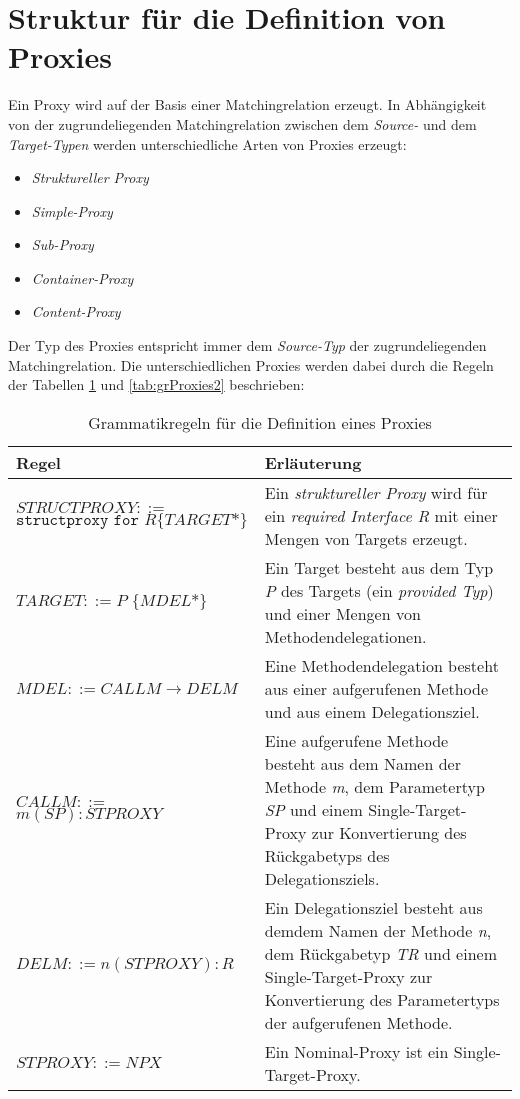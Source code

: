 \documentclass[a4paper,12pt]{article}
\begin{document}
\section{Struktur für die Definition von Proxies}\label{sec:proxygram}
Ein Proxy wird auf der Basis einer Matchingrelation erzeugt. In Abhängigkeit von der zugrundeliegenden Matchingrelation zwischen dem \emph{Source-} und dem \emph{Target-Typen} werden unterschiedliche Arten von Proxies erzeugt:
\begin{itemize}
\item \emph{Struktureller Proxy}
\item \emph{Simple-Proxy}
\item \emph{Sub-Proxy}
\item \emph{Container-Proxy}
\item \emph{Content-Proxy}
\end{itemize}
Der Typ des Proxies entspricht immer dem \emph{Source-Typ} der zugrundeliegenden Matchingrelation. Die unterschiedlichen Proxies werden dabei durch die Regeln der Tabellen \ref{tab:grProxies1} und \ref{tab:grProxies2} beschrieben:
\begin{table}[H]
\centering
\begin{tabular}{|p{6cm}|p{8cm}|}
\hline
\hline
\centering\textbf{Regel} & \textbf{Erläuterung} \\
\hline
\hline
$\mathit{STRUCTPROXY} ::=$\newline $\texttt{structproxy } \texttt{for } R$\newline$ \texttt{\{}TARGET\text{*}\texttt{\}}$ & Ein \emph{struktureller Proxy} wird für ein \emph{required Interface R} mit einer Mengen von Targets erzeugt.  \\
\hline
$\mathit{TARGET} ::=$\newline $P \texttt{ \{}MDEL\text{*}\texttt{\}}$ & Ein Target besteht aus dem Typ \emph{P} des Targets (ein \emph{provided Typ}) und einer Mengen von Methodendelegationen.\\
\hline
$\mathit{MDEL} ::= CALLM \rightarrow DELM $  & Eine Methodendelegation besteht aus einer aufgerufenen Methode und aus einem Delegationsziel.\\
\hline
$\mathit{CALLM} ::=$\newline $m(SP):STPROXY $  & Eine aufgerufene Methode besteht aus dem Namen der Methode \emph{m}, dem Parametertyp \emph{SP} und einem Single-Target-Proxy zur Konvertierung des Rückgabetyps des Delegationsziels.\\
\hline
$\mathit{DELM} ::=$\newline $n(STPROXY):R $  & Ein Delegationsziel besteht aus demdem Namen der Methode \emph{n}, dem Rückgabetyp \emph{TR} und einem Single-Target-Proxy zur Konvertierung des Parametertyps der aufgerufenen Methode.\\
\hline
$\mathit{STPROXY} ::= NPX$ & Ein Nominal-Proxy ist ein Single-Target-Proxy.\\


\hline
\end{tabular}
\caption{Grammatikregeln für die Definition eines Proxies}
 \label{tab:grProxies1}
\end{table}
\end{document}
